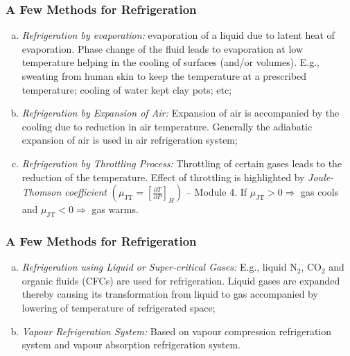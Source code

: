 \documentclass[10pt,compress]{beamer}
\newcommand{\frc}{\displaystyle\frac}
\begin{document}
\begin{frame}
 \frametitle{A Few Methods for Refrigeration}
  \begin{enumerate}[(a)]
   \item <1-> {\it Refrigeration by evaporation:} evaporation of a liquid due to latent heat of evaporation. Phase change of the fluid leads to evaporation at low temperature helping in the cooling of surfaces (and/or volumes). E.g., sweating from human skin to keep the temperature at a prescribed temperature; cooling of water kept clay pots; etc; 
   \item <2-> {\it Refrigeration by Expansion of Air:} Expansion of air is accompanied by the cooling due to reduction in air temperature. Generally the adiabatic expansion of air is used in air refrigeration system;
   \item <3-> {\it Refrigeration by Throttling Process:} Throttling of certain gases leads to the reduction of the temperature. Effect of throttling is highlighted by {\it Joule-Thomson coefficient} $\left(\mu_{\text{JT}}=\left[\frc{\partial T}{\partial P}\right]_{H}\right)$ -- Module 4. If $\mu_{\text{JT}}>0\Rightarrow$ gas cools and $\mu_{\text{JT}}<0\Rightarrow$ gas warms. 
  \end{enumerate}
\end{frame}

\begin{frame}
 \frametitle{A Few Methods for Refrigeration}
  \begin{enumerate}[(a)]
   \item <1-> {\it Refrigeration using Liquid or Super-critical Gases:} E.g., liquid N$_{2}$, CO$_{2}$ and organic fluids (CFCs) are used for refrigeration. Liquid gases are expanded thereby causing its transformation from liquid to gas accompanied by lowering of temperature of refrigerated space;
   \item <2-> {\it Vapour Refrigeration System:} Based on vapour compression refrigeration system and vapour absorption refrigeration system.
  \end{enumerate}
\end{frame}
\end{document}
